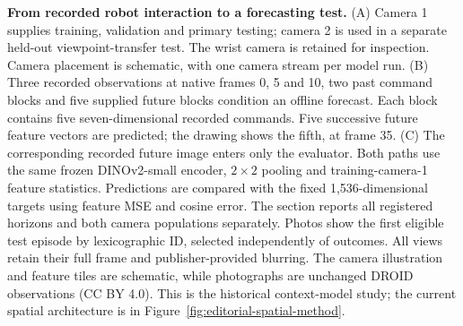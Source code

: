 \textbf{From recorded robot interaction to a forecasting test.}
(A) Camera 1 supplies training, validation and primary testing; camera 2 is used in a separate held-out viewpoint-transfer test. The wrist camera is retained for inspection. Camera placement is schematic, with one camera stream per model run.
(B) Three recorded observations at native frames 0, 5 and 10, two past command blocks and five supplied future blocks condition an offline forecast. Each block contains five seven-dimensional recorded commands. Five successive future feature vectors are predicted; the drawing shows the fifth, at frame 35.
(C) The corresponding recorded future image enters only the evaluator. Both paths use the same frozen DINOv2-small encoder, $2\times2$ pooling and training-camera-1 feature statistics. Predictions are compared with the fixed 1,536-dimensional targets using feature MSE and cosine error. The section reports all registered horizons and both camera populations separately.
Photos show the first eligible test episode by lexicographic ID, selected independently of outcomes. All views retain their full frame and publisher-provided blurring. The camera illustration and feature tiles are schematic, while photographs are unchanged DROID observations (CC BY 4.0). This is the historical context-model study; the current spatial architecture is in Figure~\ref{fig:editorial-spatial-method}.
